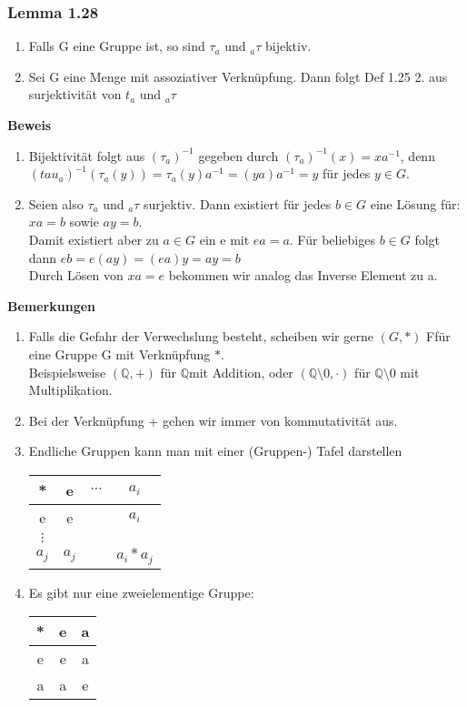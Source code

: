 \documentclass{article}
\newcommand{\Q}{\mathbb{Q}}
\newcommand{\mQ}{$\mathbb{Q}$}
\begin{document}
\subsubsection{Lemma 1.28}
\begin{enumerate}
\item{Falls G eine Gruppe ist, so sind $\tau_a$ und $_{a}\tau$ bijektiv.}
\item{Sei G eine Menge mit assoziativer Verknüpfung. Dann folgt Def 1.25 2. aus surjektivität von $t_a$ und $_{a}\tau$}
\end{enumerate}
\textbf{Beweis}\\
\begin{enumerate}
\item{
Bijektivität folgt aus  $(\tau_a)^{-1}$ gegeben durch $(\tau_a)^{-1}(x) = x a^{-1}$, denn $(tau_a)^{-1}(\tau_a(y)) = \tau_a(y)a^{-1} = (y a) a^{-1} = y$ für jedes $y \in G$.
}
\item{
 Seien also $\tau_a$ und $_{a}\tau$ surjektiv. Dann existiert für jedes $b \in G$ eine Lösung für:\\
 $x a = b$ sowie $a y = b$.\\
 Damit existiert aber zu $a \in G$ ein  e mit $ea = a$. Für beliebiges $b \in G$ folgt dann $e b = e (a y) = (e a) y = ay = b$\\
 Durch Lösen von $x a = e$ bekommen wir analog das Inverse Element zu a.
}
\end{enumerate}
\textbf{Bemerkungen}
\begin{enumerate}
\item{Falls die Gefahr der Verwechslung besteht, scheiben wir gerne $(G, *)$ Ffür eine Gruppe G mit Verknüpfung $*$.\\
Beispielsweise $(\Q, +)$ für \mQ mit Addition, oder $(\Q \setminus {0}, \cdot)$ für $\Q \setminus {0}$ mit Multiplikation.\\}
\item{Bei der Verknüpfung + gehen wir immer von kommutativität aus.}
\item{Endliche Gruppen kann man mit einer (Gruppen-) Tafel darstellen\\
\begin{tabular}{c || c | c | c}
* & e & $\cdots$ & $a_i$\\
\hline
\hline
e & e &        & $a_i$\\
\hline
$\vdots$ & & \\
\hline
$a_j$ & $a_j$& & $a_i * a_j$
\end{tabular}
}
\item{
Es gibt nur eine zweielementige Gruppe:\\
\begin{tabular}{c || c | c}
* & e & a\\
\hline
\hline
e & e & a\\
\hline
a & a & e
\end{tabular}
}
\end{enumerate}
\end{document}
